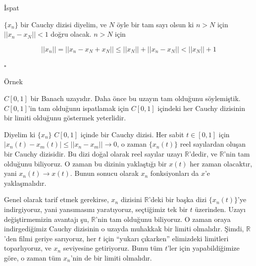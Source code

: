 \documentclass[12pt,fleqn]{article}\usepackage{../../common}
\begin{document}
İspat

$\{x_n\}$ bir Cauchy dizisi diyelim, ve $N$ öyle bir tam sayı olsun ki $n >
N$ için $||x_n - x_N|| < 1$ doğru olacak. $n > N$ için

$$ ||x_n|| = ||x_n - x_N + x_N || \le ||x_N|| + ||x_n - x_N|| < ||x_N|| + 1 $$

$ \square $

Örnek

$C[0,1]$ bir Banach uzayıdır. Daha önce bu uzayın tam olduğunu
söylemiştik. $C[0,1]$'in tam olduğunu ispatlamak için $C[0,1]$ içindeki her
Cauchy dizisinin bir limiti olduğunu göstermek yeterlidir. 

Diyelim ki $\{x_n\}$ $C[0,1]$ içinde bir Cauchy dizisi. Her sabit $t \in
[0,1]$ için $|x_n(t) - x_m(t)| \le ||x_n - x_m|| \to 0$, o zaman  $\{x_n(t)\}$
reel sayılardan oluşan bir Cauchy dizisidir. Bu dizi doğal olarak reel
sayılar uzayı $\mathbb{R}$'dedir, ve $\mathbb{R}$'nin tam olduğunu
biliyoruz. O zaman bu dizinin yaklaştığı bir $x(t)$ her zaman olacaktır,
yani $x_n(t) \to x(t)$. Bunun sonucu olarak $x_n$ fonksiyonları da $x$'e
yaklaşmalıdır. 

Genel olarak tarif etmek gerekirse, $x_n$ dizisini $\mathbb{R}$'deki bir
başka dizi $\{x_n(t)\}$'ye indirgiyoruz, yani yansımasını yaratıyoruz,
seçtiğimiz tek bir $t$ üzerinden. Uzayı değiştirmemizin avantajı şu,
$\mathbb{R}$'nin tam olduğunu biliyoruz. O zaman oraya indirgediğimiz
Cauchy dizisinin o uzayda muhakkak bir limiti olmalıdır. Şimdi,
$\mathbb{R}$'den filmi geriye sarıyoruz, her $t$ için ``yukarı çıkarken''
elimizdeki limitleri toparlıyoruz, ve $x_n$ seviyesine getiriyoruz. Bunu
tüm $t$'ler için yapabildiğimize göre, o zaman tüm $x_n$'nin de bir limiti
olmalıdır.
\end{document}

